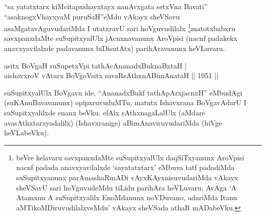 \begin{artha}
``sa yatatxtarx kiMcitapxshayxtayx nanAvxgata setxVna Bavati'' ``asaknogxVhayxyaM puruSaH''eMdu vAkayx sheVSavu asaMgatavAguvudariMda I utatxravU sari hoVguvudilalx \footnote{beVre kelavaru savxpanxdaMte suSupitxyalUlx daqSiTxyanunx AroVpisi nacnf padada anavxyavilalxde `sayatatxtarx' eMbuva tatf padadiMda suSupitxyanunx parAmashaRmADi vAyxKAyxnisuvudariMda vAkayx sheVSavU sari hoVguvudeMdu tiLidu parihAra heVLuvaru, AvAga `A Atamxnu A suSupitxyalilx EnoMdanunx noVDuvano, adariMda Itanu aMTikoMDiruvudilalxveMdu' vAkayx sheVSada athaR mADabeVku.}matotxbabxru savxpanxdaMte suSupitxyalUlx jAcnxnavanunx AroVpisi (nacnf padakekx anavxyavilalxde padavanunx biDisutAtx) parihAravanunx heVLuvaru.
\end{artha}



\begin{shl}
\footnotemark[1]asitx BoVgaH suSupetxV\s pi tathAcA\s \s nanadxBuknaBxtaH | \\
\footnotemark[2]aishavxroV vA\s tarx BoVgoV\s sitx savaRsAthxnABimAnataH \hfill||  1051 ||  
\end{shl}

\begin{artha}
suSupitxyalUlx BoVgavu ide, ``AnanadxBukf tathApArxjacnxH'' eMbudAgi (suKAnuBavavanunx) opipxruvuduMTu, matutx Ishavxrana BoVgavAdarU I suSupitxyalilxde enanx beVku. elAlx sAthxnagaLalUlx (aMdare avasAthxtarxyadalilx) (Ishavxranige) aBimAnaviruvudariMda (hiVge heVLabeVku).
\end{artha}

